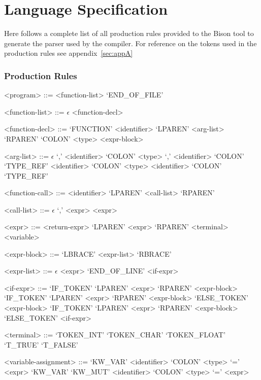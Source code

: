 \section{Language Specification}
\label{sec:appB}

Here follows a complete list of all production rules provided to the Bison tool to
generate the parser used by the \lang{} compiler. For reference on the tokens used in
the production rules see appendix~\ref{sec:appA}

\subsubsection*{Production Rules}

\begin{grammar}
<program> ::= <function-list> `END_OF_FILE'

<function-list> ::= $\epsilon$
 <function-decl>

<function-decl> ::= `FUNCTION' <identifier> `LPAREN' <arg-list> `RPAREN' `COLON' <type> <expr-block>

<arg-list> ::= $\epsilon$
 `,' <identifier> `COLON' <type>
 `,' <identifier> `COLON' `TYPE_REF'
\alt <identifier> `COLON' <type>
\alt <identifier> `COLON' `TYPE_REF'

<function-call> ::= <identifier> `LPAREN' <call-list> `RPAREN'

<call-list> ::= $\epsilon$
 `,' <expr>
\alt <expr>

<expr> ::= <return-expr>
\alt `LPAREN' <expr> `RPAREN'
\alt <terminal>
\alt <variable>

<expr-block> ::= `LBRACE' <expr-list> `RBRACE'

<expr-list> ::= $\epsilon$
 <expr> `END_OF_LINE'
 <if-expr>

<if-expr> ::= `IF_TOKEN' `LPAREN' <expr> `RPAREN' <expr-block>
\alt `IF_TOKEN' `LPAREN' <expr> `RPAREN' <expr-block> `ELSE_TOKEN' <expr-block>
\alt `IF_TOKEN' `LPAREN' <expr> `RPAREN' <expr-block> `ELSE_TOKEN' <if-expr>

<terminal> ::= `TOKEN_INT'
\alt `TOKEN_CHAR'
\alt `TOKEN_FLOAT'
\alt `T_TRUE'
\alt `T_FALSE'

<variable-assignment> ::= `KW_VAR' <identifier> `COLON' <type> `=' <expr>
\alt `KW_VAR' `KW_MUT' <identifier> `COLON' <type> `=' <expr>


\end{grammar}
